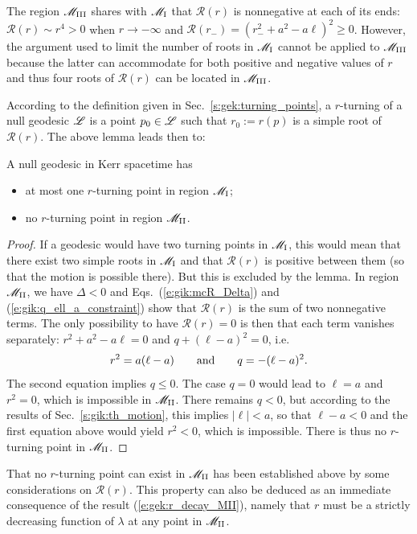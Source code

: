 \begin{remark} \label{r:gik:R_zero_M_III}
The region $\mathscr{M}_{\rm III}$ shares with $\mathscr{M}_{\rm I}$ that $\mathcal{R}(r)$ is
nonnegative at each of its ends: $\mathcal{R}(r) \sim r^4 > 0$ when $r\to -\infty$
and $\mathcal{R}(r_-) = (r_-^2 + a^2 - a \ell)^2 \geq 0$. However, the argument
used to limit the number of roots in $\mathscr{M}_{\rm I}$
cannot be applied to $\mathscr{M}_{\rm III}$ because the latter can accommodate for both positive and negative
values of $r$ and thus four roots of $\mathcal{R}(r)$ can be located in $\mathscr{M}_{\rm III}$.
\end{remark}


According to the definition given in Sec.~\ref{s:gek:turning_points},
a $r$-turning of a null geodesic $\mathscr{L}$ is a point $p_0\in \mathscr{L}$
such that $r_0 := r(p)$ is a simple root of $\mathcal{R}(r)$.
The above lemma leads then to:
\begin{greybox}
A null geodesic in Kerr spacetime has
\begin{itemize}
\item at most one $r$-turning point in region $\mathscr{M}_{\rm I}$;
\item no $r$-turning point in region $\mathscr{M}_{\rm II}$.
\end{itemize}
\end{greybox}
\begin{proof}
If a geodesic would have two turning points in $\mathscr{M}_{\rm I}$, this would mean
that there exist two simple roots in $\mathscr{M}_{\rm I}$ and that
$\mathcal{R}(r)$ is positive between them (so that the motion is possible
there). But this is excluded by the lemma.
In region $\mathscr{M}_{\rm II}$, we have $\Delta < 0$ and
Eqs.~(\ref{e:gik:mcR_Delta}) and (\ref{e:gik:q_ell_a_constraint}) show that
$\mathcal{R}(r)$ is the sum of two nonnegative terms. The only possibility
to have $\mathcal{R}(r)=0$ is then that each term vanishes separately:
$r^2 + a^2 - a\ell = 0$ and $q + (\ell -a)^2 = 0$, i.e.
\[
  r^2 = a (\ell - a) \qquad\mbox{and}\qquad q = - (\ell - a)^2 .
\]
The second equation implies $q\leq 0$. The case $q=0$ would lead to $\ell = a$ and $r^2 = 0$,
which is impossible in $\mathscr{M}_{\rm II}$. There remains $q < 0$, but
according to the results of Sec.~\ref{s:gik:th_motion}, this implies $|\ell| < a$, so
that $\ell - a < 0$ and the first equation above would yield $r^2 < 0$, which is impossible.
There is thus no $r$-turning point in $\mathscr{M}_{\rm II}$.
\end{proof}

\begin{remark}
That no $r$-turning point can exist in $\mathscr{M}_{\rm II}$ has been established
above by some considerations on $\mathcal{R}(r)$. This property can also be deduced as
an immediate consequence of the result (\ref{e:gek:r_decay_MII}), namely
that $r$ must be a strictly decreasing function of $\lambda$ at any point
in $\mathscr{M}_{\rm II}$.
\end{remark}

